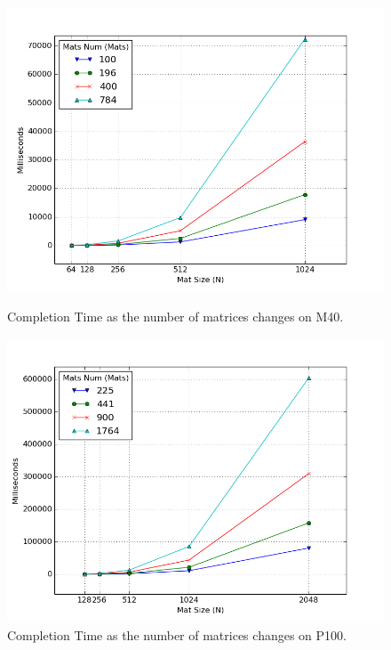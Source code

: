 \begin{figure}
	\centering
	\vspace{-2cm}
	\includegraphics[scale=0.7]{plots/mat_comp_numvar.png}
	\caption{Completion Time as the number of matrices changes on M40.}
	
	\includegraphics[scale=0.7]{plots/mat_comp_numvar_P100.png}
	\caption{Completion Time as the number of matrices changes on P100.}
	\label{fig:matcompnum}
\end{figure} 

